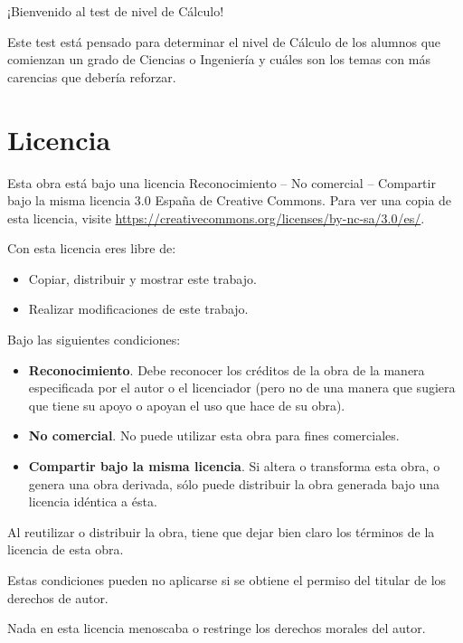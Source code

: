 \documentclass[
  a4paper,
]{scrreport}
\providecommand{\tightlist}{%
  \setlength{\itemsep}{0pt}\setlength{\parskip}{0pt}}\usepackage{longtable,booktabs,array}
\theoremstyle{definition}
\theoremstyle{remark}
\begin{document}

¡Bienvenido al test de nivel de Cálculo!

Este test está pensado para determinar el nivel de Cálculo de los
alumnos que comienzan un grado de Ciencias o Ingeniería y cuáles son los
temas con más carencias que debería reforzar.

\section*{Licencia}\label{licencia}


Esta obra está bajo una licencia Reconocimiento -- No comercial --
Compartir bajo la misma licencia 3.0 España de Creative Commons. Para
ver una copia de esta licencia, visite
\url{https://creativecommons.org/licenses/by-nc-sa/3.0/es/}.

Con esta licencia eres libre de:

\begin{itemize}
\tightlist
\item
  Copiar, distribuir y mostrar este trabajo.
\item
  Realizar modificaciones de este trabajo.
\end{itemize}

Bajo las siguientes condiciones:

\begin{itemize}
\item
  \textbf{Reconocimiento}. Debe reconocer los créditos de la obra de la
  manera especificada por el autor o el licenciador (pero no de una
  manera que sugiera que tiene su apoyo o apoyan el uso que hace de su
  obra).
\item
  \textbf{No comercial}. No puede utilizar esta obra para fines
  comerciales.
\item
  \textbf{Compartir bajo la misma licencia}. Si altera o transforma esta
  obra, o genera una obra derivada, sólo puede distribuir la obra
  generada bajo una licencia idéntica a ésta.
\end{itemize}

Al reutilizar o distribuir la obra, tiene que dejar bien claro los
términos de la licencia de esta obra.

Estas condiciones pueden no aplicarse si se obtiene el permiso del
titular de los derechos de autor.

Nada en esta licencia menoscaba o restringe los derechos morales del
autor.
\end{document}

